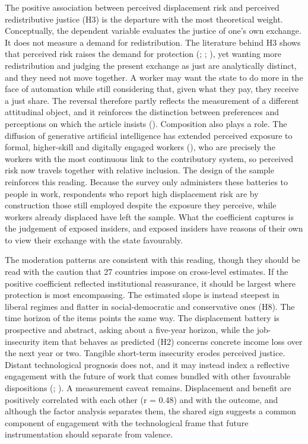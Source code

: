 \documentclass[
  12pt,
]{article}
\begin{document}
The positive association between perceived displacement risk and
perceived redistributive justice (H3) is the departure with the most
theoretical weight. Conceptually, the dependent variable evaluates the
justice of one's own exchange. It does not measure a demand for
redistribution. The literature behind H3 shows that perceived risk
raises the demand for protection
(;
;
),
yet wanting more redistribution and judging the present exchange as just
are analytically distinct, and they need not move together. A worker may
want the state to do more in the face of automation while still
considering that, given what they pay, they receive a just share. The
reversal therefore partly reflects the measurement of a different
attitudinal object, and it reinforces the distinction between
preferences and perceptions on which the article insists
(). Composition also
plays a role. The diffusion of generative artificial intelligence has
extended perceived exposure to formal, higher-skill and digitally
engaged workers (), who are precisely the workers with the most continuous
link to the contributory system, so perceived risk now travels together
with relative inclusion. The design of the sample reinforces this
reading. Because the survey only administers these batteries to people
in work, respondents who report high displacement risk are by
construction those still employed despite the exposure they perceive,
while workers already displaced have left the sample. What the
coefficient captures is the judgement of exposed insiders, and exposed
insiders have reasons of their own to view their exchange with the state
favourably.

The moderation patterns are consistent with this reading, though they
should be read with the caution that 27 countries impose on cross-level
estimates. If the positive coefficient reflected institutional
reassurance, it should be largest where protection is most encompassing.
The estimated slope is instead steepest in liberal regimes and flatter
in social-democratic and conservative ones (H8). The time horizon of the
items points the same way. The displacement battery is prospective and
abstract, asking about a five-year horizon, while the job-insecurity
item that behaves as predicted (H2) concerns concrete income loss over
the next year or two. Tangible short-term insecurity erodes perceived
justice. Distant technological prognosis does not, and it may instead
index a reflective engagement with the future of work that comes bundled
with other favourable dispositions
(;
). A measurement caveat
remains. Displacement and benefit are positively correlated with each
other (r = 0.48) and with the outcome, and although the factor analysis
separates them, the shared sign suggests a common component of
engagement with the technological frame that future instrumentation
should separate from valence.
\end{document}
